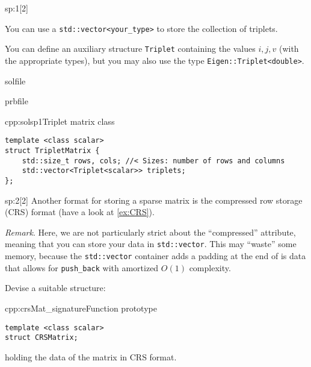 \begin{samproblem}
\begin{subproblem}{sp:1}[2]
  \begin{samhint}
    You can use a \verb|std::vector<your_type>| to store the collection of triplets.
  \end{samhint}
  
  \begin{samhint}
    You can define an auxiliary structure \verb|Triplet| containing the values
    $i,j,v$ (with the appropriate types), but you may also use the type
    \verb|Eigen::Triplet<double>|. 
  \end{samhint}

  \begin{samwriteprbpart}{solfile}
    \begin{writeverbatim}{prbfile}
      \begin{samsolution}
			\begin{samcode}[C++-code]{cpp:solsp1}{Triplet matrix class}
				\begin{lstlisting}[style=cpp]
template <class scalar>
struct TripletMatrix {
	std::size_t rows, cols; //< Sizes: number of rows and columns
	std::vector<Triplet<scalar>> triplets;
};
				\end{lstlisting}
			\end{samcode}
      \end{samsolution}
    \end{writeverbatim}
  \end{samwriteprbpart}

\end{subproblem}

\begin{subproblem}{sp:2}[2]
  Another format for storing a sparse matrix is the compressed row storage (CRS)
  format (have a look at \cref{ex:CRS}). 

  \textit{Remark}. Here, we are not particularly strict about the ``compressed''
  attribute, meaning that you can store your data in \verb|std::vector|. This may
  ``waste'' some memory, because the \texttt{std::vector} container adds a
  padding at the end of is data that allows for \texttt{push\_back} with
  amortized $O(1)$ complexity.
 
  Devise a suitable structure:
  \begin{samcode}[C++-code]{cpp:crsMat_signature}{Function prototype}
  	 \begin{lstlisting}[style=cpp]
template <class scalar>
struct CRSMatrix;
	 \end{lstlisting}
  \end{samcode}
   holding the data of the matrix in CRS format.
   

\end{subproblem}
\end{samproblem}
